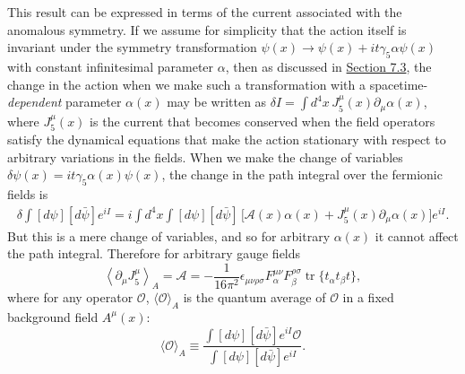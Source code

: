 This result can be expressed in terms of the current associated with the
anomalous symmetry. If we assume for simplicity that the action itself is
invariant under the symmetry transformation
$\psi(x)\to\psi(x)+it\gamma_5\alpha\psi(x)$ with constant infinitesimal
parameter $\alpha$, then as discussed in
\hyperref[sec:7.3]{Section 7.3}, the change in the action when we make such
a transformation with a spacetime-\emph{dependent} parameter $\alpha(x)$
may be written as
$\delta I=\int d^4x\,J_5^\mu(x)\partial_\mu\alpha(x)$, where $J_5^\mu(x)$
is the current that becomes conserved when the field operators satisfy the
dynamical equations that make the action stationary with respect to
arbitrary variations in the fields. When we make the change of variables
$\delta\psi(x)=it\gamma_5\alpha(x)\psi(x)$, the change in the path integral
over the fermionic fields is
\begin{equation}
 \begin{aligned}
 \delta\int[d\psi][d\bar\psi]e^{iI}
 =i\int d^4x\int[d\psi][d\bar\psi]\,
 \bigl[\mathcal A(x)\alpha(x)
 +J_5^\mu(x)\partial_\mu\alpha(x)\bigr]e^{iI}.
 \end{aligned}
 \tag{22.2.25}\label{eq:22.2.25}
\end{equation}
But this is a mere change of variables, and so for arbitrary $\alpha(x)$
it cannot affect the path integral. Therefore for arbitrary gauge fields
\begin{equation}
 \left\langle\partial_\mu J_5^\mu\right\rangle_A
 =\mathcal A
 =-\frac{1}{16\pi^2}\epsilon_{\mu\nu\rho\sigma}
 F_\alpha^{\mu\nu}F_\beta^{\rho\sigma}
 \operatorname{tr}\{t_\alpha t_\beta t\},
 \tag{22.2.26}\label{eq:22.2.26}
\end{equation}
where for any operator $\mathcal O$, $\langle\mathcal O\rangle_A$ is the
quantum average of $\mathcal O$ in a fixed background field $A^\mu(x)$:
\begin{equation}
 \langle\mathcal O\rangle_A\equiv
 \frac{\int[d\psi][d\bar\psi]e^{iI}\mathcal O}
 {\int[d\psi][d\bar\psi]e^{iI}}.
 \tag{22.2.27}\label{eq:22.2.27}
\end{equation}

